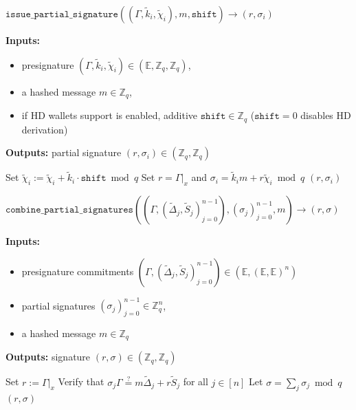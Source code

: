 \documentclass[11pt]{article}
\newenvironment{inlineAlgorithm}{}{}
\newcommand{\algoName}[1]{#1 \par}
\newcommand{\algoInputsList}[1]{
    {\small \bf Inputs:} 
        \begin{itemize}[noitemsep,topsep=0pt]
            #1
        \end{itemize}
}
\newcommand{\algoOutputs}[1]{
    {\small \bf Outputs:} #1 \par
}
\newcommand{\fn}[1]{\ensuremath{\mathtt{#1}}}
\newcommand{\var}[1]{\ensuremath{\mathtt{#1}}}
\newcommand{\affineX}[1]{#1|_{\textit{x}}}
\newcommand{\E}{\mathbb{E}}
\newcommand{\Z}{\mathbb{Z}}
\newcommand{\?}[1]{\stackrel{?}{#1}}
\begin{document}
\begin{description}

\item
\begin{inlineAlgorithm}
\algoName{$\fn{issue\_partial\_signature}((\Gamma, \tilde k_i, \tilde \chi_i), m, \var{shift}) \to (r, \sigma_i)$}
\algoInputsList{
    \item presignature $(\Gamma, \tilde k_i, \tilde \chi_i) \in (\E, \Z_q, \Z_q)$,
    \item a hashed message $m \in \Z_q$,
    \item if HD wallets support is enabled, additive $\var{shift} \in \Z_q$ ($\var{shift} = 0$ disables HD derivation)
}
\algoOutputs{partial signature $(r, \sigma_i) \in (\Z_q, \Z_q)$}
\begin{algorithmic}[1]
    \State Set $\tilde \chi_i := \tilde \chi_i + \tilde k_i \cdot \var{shift} \bmod q$
\EndIf
\State Set $r = \affineX{\Gamma}$ and $\sigma_i = \tilde k_i m + r \tilde \chi_i \bmod q$
\State \Return $(r, \sigma_i)$
\end{algorithmic}
\end{inlineAlgorithm}

\item
\begin{inlineAlgorithm}
\algoName{$\fn{combine\_partial\_signatures}(
    (\Gamma, (\tilde \Delta_j, \tilde S_j)_{j=0}^{n-1}),
    (\sigma_j)_{j=0}^{n-1},
    m
) \to (r, \sigma)$}
\algoInputsList{
    \item presignature commitments $(\Gamma, (\tilde \Delta_j, \tilde S_j)_{j=0}^{n-1}) \in (\E, (\E, \E)^n)$
    \item partial signatures $(\sigma_j)_{j=0}^{n-1} \in \Z_q^n$,
    \item a hashed message $m \in \Z_q$
}
\algoOutputs{signature $(r, \sigma) \in (\Z_q, \Z_q)$}
\begin{algorithmic}[1]
\State Set $r := \affineX{\Gamma}$
\State Verify that $\sigma_j \Gamma \? = m \tilde \Delta_j + r \tilde S_j$ for all $j \in [n]$
\State Let $\sigma = \sum_j \sigma_j \bmod q$
\State \Return $(r, \sigma)$
\end{algorithmic}
\end{inlineAlgorithm}

\end{description}
    
\end{document}
